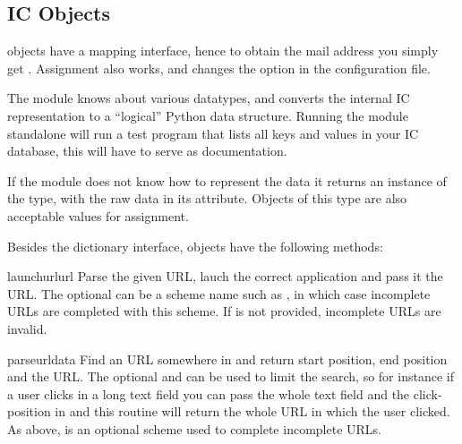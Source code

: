 \subsection{IC Objects}

 objects have a mapping interface, hence to obtain the mail
address you simply get . Assignment also
works, and changes the option in the configuration file.

The module knows about various datatypes, and converts the internal IC
representation to a ``logical'' Python data structure. Running the
 module standalone will run a test program that lists all
keys and values in your IC database, this will have to serve as
documentation.

If the module does not know how to represent the data it returns an
instance of the  type, with the raw data in its
 attribute. Objects of this type are also acceptable values
for assignment.

Besides the dictionary interface,  objects have the
following methods:


\begin{methoddesc}{launchurl}{url}
Parse the given URL, lauch the correct application and pass it the
URL. The optional  can be a scheme name such as
, in which case incomplete URLs are completed with this
scheme.  If  is not provided, incomplete URLs are invalid.
\end{methoddesc}

\begin{methoddesc}{parseurl}{data}
Find an URL somewhere in  and return start position, end
position and the URL. The optional  and  can be
used to limit the search, so for instance if a user clicks in a long
text field you can pass the whole text field and the click-position in
 and this routine will return the whole URL in which the
user clicked.  As above,  is an optional scheme used to
complete incomplete URLs.
\end{methoddesc}

